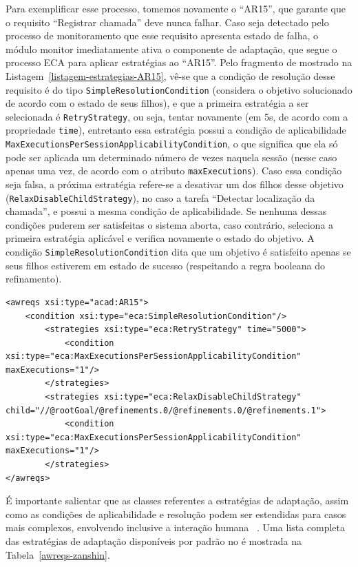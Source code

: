 Para exemplificar esse processo, tomemos novamente o \awreq ``AR15'', que garante que o requisito ``Registrar chamada'' deve nunca falhar. Caso seja detectado pelo processo de monitoramento que esse requisito apresenta estado de falha, o módulo monitor imediatamente ativa o componente de adaptação, que segue o processo ECA para aplicar estratégias ao ``AR15''. Pelo fragmento de \xml mostrado na Listagem~\ref{listagem-estrategias-AR15}, vê-se que a condição de resolução desse requisito é do tipo \texttt{SimpleResolutionCondition} (considera o objetivo solucionado de acordo com o estado de seus filhos), e que a primeira estratégia a ser selecionada é \texttt{RetryStrategy}, ou seja, tentar novamente (em 5s, de acordo com a propriedade \texttt{time}), entretanto essa estratégia possui a condição de aplicabilidade \texttt{MaxExecutionsPerSessionApplicabilityCondition}, o que significa que ela só pode ser aplicada um determinado número de vezes naquela sessão (nesse caso apenas uma vez, de acordo com o atributo \texttt{maxExecutions}). Caso essa condição seja falsa, a próxima estratégia refere-se a desativar um dos filhos desse objetivo (\texttt{RelaxDisableChildStrategy}), no caso a tarefa ``Detectar localização da chamada'', e possui a mesma condição de aplicabilidade. Se nenhuma dessas condições puderem ser satisfeitas o sistema aborta, caso contrário, seleciona a primeira estratégia aplicável e verifica novamente o estado do objetivo. A condição \texttt{SimpleResolutionCondition} dita que um objetivo é satisfeito apenas se seus filhos estiverem em estado de sucesso (respeitando a regra booleana do refinamento). 

\begin{lstlisting}[caption={Estratégias de adaptação de AR15},label={listagem-estrategias-AR15}]
<awreqs xsi:type="acad:AR15">										
	<condition xsi:type="eca:SimpleResolutionCondition"/>
		<strategies xsi:type="eca:RetryStrategy" time="5000">
			<condition xsi:type="eca:MaxExecutionsPerSessionApplicabilityCondition" maxExecutions="1"/>
		</strategies>
		<strategies xsi:type="eca:RelaxDisableChildStrategy" child="//@rootGoal/@refinements.0/@refinements.0/@refinements.1">
			<condition xsi:type="eca:MaxExecutionsPerSessionApplicabilityCondition" maxExecutions="1"/>
		</strategies>
</awreqs>
\end{lstlisting}

É importante salientar que as classes referentes a estratégias de adaptação, assim como as condições de aplicabilidade e resolução podem ser estendidas para casos mais complexos, envolvendo inclusive a interação humana ~\cite{tesevitor}. Uma lista completa das estratégias de adaptação disponíveis por padrão no \zanshin é mostrada na Tabela~\ref{awreqs-zanshin}.

